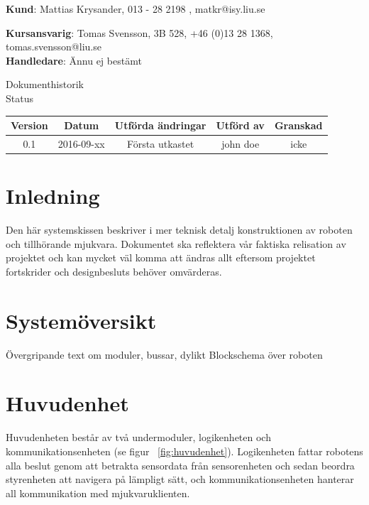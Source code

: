 \documentclass{article}
\begin{document}
\begin{center}
\textbf{Kund}: Mattias Krysander, 013 - 28 2198 , matkr@isy.liu.se
\end{center}

\begin{center}
\textbf{Kursansvarig}: Tomas Svensson, 3B 528, +46 (0)13 28 1368, tomas.svensson@liu.se \\
\textbf{Handledare}: Ännu ej bestämt
\end{center}
\vspace*{\fill}
\clearpage

\renewcommand*\contentsname{Innehållsförteckning}
\tableofcontents
\clearpage


{
\sffamily
\centering
\large


{\huge 
Dokumenthistorik \\
}
Status
\begin{center}
\begin{tabular}{ | c | c | c | c | c |} 
\hline
\textbf{Version} & \textbf{Datum} & \textbf{Utförda ändringar} & \textbf{Utförd av } & \textbf{Granskad} \\  
\hline
0.1 & 2016-09-xx & Första utkastet &  john doe & icke \\
\hline
\end{tabular}
\end{center}
}

\clearpage


\section{Inledning}
Den här systemskissen beskriver i mer teknisk detalj konstruktionen av roboten och tillhörande mjukvara. Dokumentet ska reflektera vår faktiska relisation av projektet och kan mycket väl komma att ändras allt eftersom projektet fortskrider och designbesluts behöver omvärderas.

\section{Systemöversikt}
Övergripande text om moduler, bussar, dylikt
Blockschema över roboten

\section{Huvudenhet}

Huvudenheten består av två undermoduler, logikenheten och kommunikationsenheten (se figur ~\ref{fig:huvudenhet}). Logikenheten fattar robotens alla beslut genom att betrakta sensordata från sensorenheten och sedan beordra styrenheten att navigera på lämpligt sätt, och kommunikationsenheten hanterar all kommunikation med mjukvaruklienten. 
\end{document}
